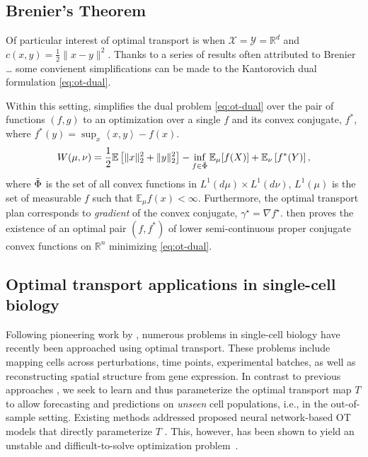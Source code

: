 \subsection{Brenier's Theorem}
Of particular interest of optimal transport is when $\mathcal{X} = \mathcal{Y} = \mathbb{R}^d$ and $c(x, y) = \frac{1}{2} \| x - y \|^2$.
Thanks to a series of results often attributed to Brenier \cite{brenier}\ldots %
some convienent simplifications can be made to the Kantorovich dual formulation \ref{eq:ot-dual}.

Within this setting, \citet[Theorem 2.9]{villani2021topics} simplifies the dual problem \eqref{eq:ot-dual} over the pair of functions $(f, g)$ to
an optimization over a single $f$ and its convex conjugate, $f^*$, where $ f^*(y) = \sup_x \left<x,y\right> - f(x)$.
\begin{equation} \label{eq:ot-dual-brenier}
    W(\mu, \nu)= \frac{1}{2}\mathbb{E}\left[\|x\|_{2}^{2}+\|y\|_{2}^{2}\right]-\inf _{f \in \Tilde{\Phi}} \mathbb{E}_{\mu}[f(X)]+\mathbb{E}_{\nu}\left[f^{*}(Y)\right],
\end{equation}
where $\Tilde{\Phi}$ is the set of all convex functions in $L^1(d\mu) \times L^1(d\nu)$,
$L^{1}(\mu)$ is the set of measurable $f$ such that $\mathbb{E}_\mu f(x) < \infty$.
Furthermore, the optimal transport plan corresponds to \emph{gradient} of the convex conjugate, $\gamma^\star = \nabla f^\star$.
\citet[Theorem 2.9]{villani2021topics} then proves the existence of an optimal pair $(f, f^*)$ of lower semi-continuous proper conjugate convex functions on $\mathbb{R}^n$ minimizing \eqref{eq:ot-dual}.

\subsection{Optimal transport applications in single-cell biology}
Following pioneering work by \citet{schiebinger2019optimal}, numerous problems in single-cell biology have recently been approached using optimal transport.
These problems include mapping cells across perturbations, time points, experimental batches, as well as reconstructing spatial structure from gene expression.
In contrast to previous approaches \citep{schiebinger2019optimal, lavenant2021towards},
we seek to learn and thus parameterize the optimal transport map $T$ to allow forecasting and predictions on \emph{unseen} cell populations,
i.e., in the out-of-sample setting.
Existing methods addressed proposed neural network-based OT models that directly parameterize $T$ \citep{jacob2018w2gan, yang2018scalable, prasad2020optimal}.
This, however, has been shown to yield an unstable and difficult-to-solve optimization problem~\citep[Table 1]{makkuva2020optimal}.


